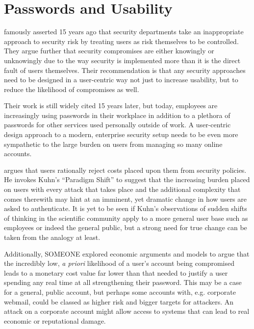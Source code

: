 \documentclass{report}
\begin{document}

\section{Passwords and Usability}

\cite{adams1999users} famously asserted 15 years ago that security
departments take an inappropriate approach to security risk
by treating users as risk themselves to be controlled. They
argue further that security compromises are either knowingly
or unknowingly due to the way security is implemented more than
it is the direct fault of users themselves. Their recommendation
is that any security approaches need to be designed in
a user-centric way not just to increase usability, but to
reduce the likelihood of compromises as well.

Their work is still widely cited 15 years later, but
today, employees are increasingly using passwords in their
workplace in addition to a plethora of passwords for
other services used personally outside of work.
A user-centric design
approach to a modern, enterprise security setup needs to
be even more sympathetic to the large burden on users
from managing so many online accounts.

\cite{herley2009so} argues that users rationally reject costs
placed upon them from security policies. He invokes Kuhn's
``Paradigm Shift''\parencite{kuhn1962structure} to suggest
that the increasing burden placed on users with every attack
that takes place and the additional complexity that comes
therewith may hint at an imminent, yet dramatic change in
how users are asked to authenticate. It is yet to be seen
if Kuhn's observations of sudden shifts of thinking
in the scientific community apply to a more general
user base such as employees or indeed the general public, but
a strong need for true change can be taken from the analogy
at least.


Additionally, SOMEONE explored economic arguments and models
to argue that the incredibly low, \emph{a priori} likelihood
of a user's account being compromised leads to a monetary
cost value far lower than that needed to justify a user
spending any real time at all strengthening their password.
This may be a case for a general, public account, but perhaps
some accounts with, e.g. corporate webmail, could be classed
as higher risk and bigger targets for attackers. An attack
on a corporate account might allow access to systems that
can lead to real economic or reputational damage.
\end{document}
